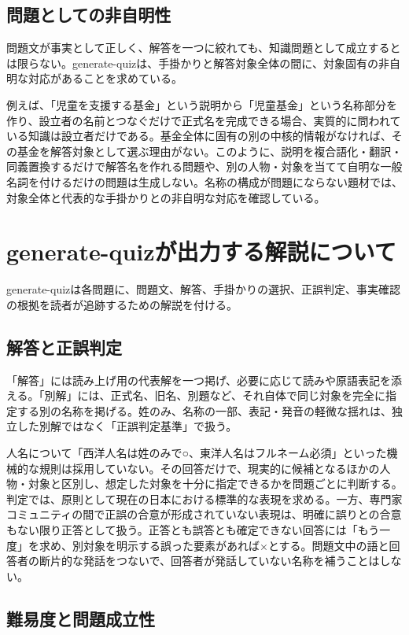 \subsection*{問題としての非自明性}

問題文が事実として正しく、解答を一つに絞れても、知識問題として成立するとは限らない。generate-quizは、手掛かりと解答対象全体の間に、対象固有の非自明な対応があることを求めている。

例えば、「児童を支援する基金」という説明から「児童基金」という名称部分を作り、設立者の名前とつなぐだけで正式名を完成できる場合、実質的に問われている知識は設立者だけである。基金全体に固有の別の中核的情報がなければ、その基金を解答対象として選ぶ理由がない。このように、説明を複合語化・翻訳・同義置換するだけで解答名を作れる問題や、別の人物・対象を当てて自明な一般名詞を付けるだけの問題は生成しない。名称の構成が問題にならない題材では、対象全体と代表的な手掛かりとの非自明な対応を確認している。

\section*{generate-quizが出力する解説について}

generate-quizは各問題に、問題文、解答、手掛かりの選択、正誤判定、事実確認の根拠を読者が追跡するための解説を付ける。

\subsection*{解答と正誤判定}

「解答」には読み上げ用の代表解を一つ掲げ、必要に応じて読みや原語表記を添える。「別解」には、正式名、旧名、別題など、それ自体で同じ対象を完全に指定する別の名称を掲げる。姓のみ、名称の一部、表記・発音の軽微な揺れは、独立した別解ではなく「正誤判定基準」で扱う。

人名について「西洋人名は姓のみで○、東洋人名はフルネーム必須」といった機械的な規則は採用していない。その回答だけで、現実的に候補となるほかの人物・対象と区別し、想定した対象を十分に指定できるかを問題ごとに判断する。判定では、原則として現在の日本における標準的な表現を求める。一方、専門家コミュニティの間で正誤の合意が形成されていない表現は、明確に誤りとの合意もない限り正答として扱う。正答とも誤答とも確定できない回答には「もう一度」を求め、別対象を明示する誤った要素があれば×とする。問題文中の語と回答者の断片的な発話をつないで、回答者が発話していない名称を補うことはしない。

\subsection*{難易度と問題成立性}

